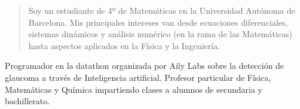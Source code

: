 \documentclass[10pt,a4paper,ragged2e,withhyper]{altacv}
\begin{document}
\begin{paracol}{2}







  \newpage

  \switchcolumn

  \begin{quote}
    Soy un estudiante de 4º de Matemáticas en la Universidad Autónoma de Bar\-ce\-lo\-na. Mis principales intereses van desde ecuaciones diferenciales, sistemas dinámicos y análisis numérico (en la rama de las Matemáticas) hasta aspectos aplicados en la Física y la Ingeniería.
  \end{quote}

  Programador en la datathon organizada por Aily Labs sobre  la detección de glaucoma a través de Inteligencia artificial.
  \divider
  Profesor particular de Física, Matemáticas y Química impartiendo clases a alumnos de secundaria y bachillerato.


\end{paracol}
\end{document}
